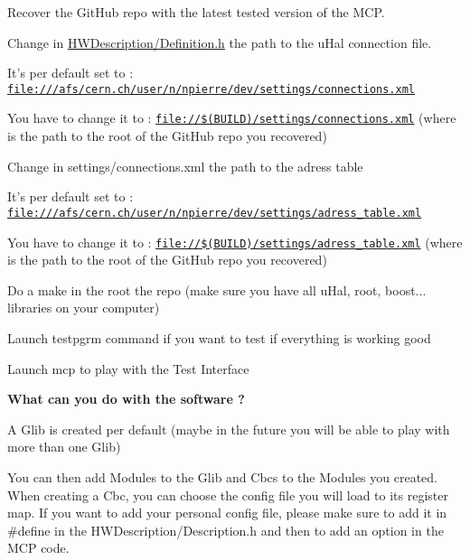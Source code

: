 \begin{DoxyEnumerate}
\item Recover the Git\-Hub repo with the latest tested version of the M\-C\-P.
\item Change in \hyperlink{_definition_8h}{H\-W\-Description/\-Definition.\-h} the path to the u\-Hal connection file.
\begin{DoxyItemize}
\item It's per default set to \-: \href{file:///afs/cern.ch/user/n/npierre/dev/settings/connections.xml}{\tt file\-:///afs/cern.\-ch/user/n/npierre/dev/settings/connections.\-xml}
\item You have to change it to \-: \href{file://$(BUILD)/settings/connections.xml}{\tt file\-://\$(\-B\-U\-I\-L\-D)/settings/connections.\-xml} (where  is the path to the root of the Git\-Hub repo you recovered)
\end{DoxyItemize}
\item Change in settings/connections.\-xml the path to the adress table
\begin{DoxyItemize}
\item It's per default set to \-: \href{file:///afs/cern.ch/user/n/npierre/dev/settings/adress_table.xml}{\tt file\-:///afs/cern.\-ch/user/n/npierre/dev/settings/adress\-\_\-table.\-xml}
\item You have to change it to \-: \href{file://$(BUILD)/settings/adress_table.xml}{\tt file\-://\$(\-B\-U\-I\-L\-D)/settings/adress\-\_\-table.\-xml} (where  is the path to the root of the Git\-Hub repo you recovered)
\end{DoxyItemize}
\item Do a make in the root the repo (make sure you have all u\-Hal, root, boost... libraries on your computer)
\item Launch testpgrm command if you want to test if everything is working good
\item Launch mcp to play with the Test Interface \par
 \par
 {\bfseries What can you do with the software ?}
\end{DoxyEnumerate}

A Glib is created per default (maybe in the future you will be able to play with more than one Glib)

You can then add Modules to the Glib and Cbcs to the Modules you created. When creating a Cbc, you can choose the config file you will load to its register map. If you want to add your personal config file, please make sure to add it in \#define in the H\-W\-Description/\-Description.\-h and then to add an option in the M\-C\-P code.


